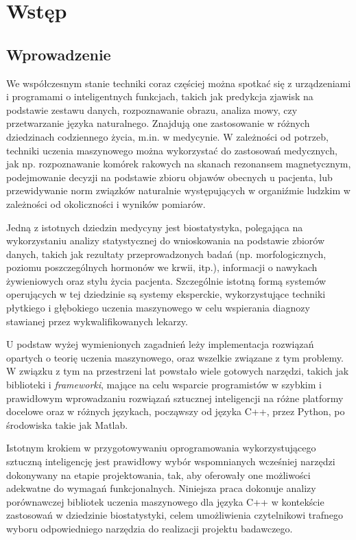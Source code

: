 \chapter{Wstęp}
\section{Wprowadzenie} %

We współczesnym stanie techniki coraz częściej można spotkać się z urządzeniami i programami o inteligentnych funkcjach, takich jak predykcja zjawisk na podstawie zestawu danych, rozpoznawanie obrazu, analiza mowy, czy przetwarzanie języka naturalnego. Znajdują one zastosowanie w różnych dziedzinach codziennego życia, m.in. w medycynie. W zależności od potrzeb, techniki uczenia maszynowego można wykorzystać do zastosowań medycznych, jak np. rozpoznawanie komórek rakowych na skanach rezonansem magnetycznym, podejmowanie decyzji na podstawie zbioru objawów obecnych u pacjenta, lub przewidywanie norm związków naturalnie występujących w organiźmie ludzkim w zależności od okoliczności i wyników pomiarów. 

Jedną z istotnych dziedzin medycyny jest biostatystyka, polegająca na wykorzystaniu analizy statystycznej do wnioskowania na podstawie zbiorów danych, takich jak rezultaty przeprowadzonych badań (np. morfologicznych, poziomu poszczególnych hormonów we krwii, itp.), informacji o nawykach żywieniowych oraz stylu życia pacjenta. Szczególnie istotną formą systemów operujących w tej dziedzinie są systemy eksperckie, wykorzystujące techniki płytkiego i głębokiego uczenia maszynowego w celu wspierania diagnozy stawianej przez wykwalifikowanych lekarzy. 

U podstaw wyżej wymienionych zagadnień leży implementacja rozwiązań opartych o teorię uczenia maszynowego, oraz wszelkie związane z tym problemy. W związku z tym na przestrzeni lat powstało wiele gotowych narzędzi, takich jak biblioteki i \textit{frameworki}, mające na celu wsparcie programistów w szybkim i prawidłowym wprowadzaniu rozwiązań sztucznej inteligencji na różne platformy docelowe oraz w różnych językach, począwszy od języka C++, przez Python, po środowiska takie jak Matlab. 

Istotnym krokiem w przygotowywaniu oprogramowania wykorzystującego sztuczną inteligencję jest prawidłowy wybór wspomnianych wcześniej narzędzi dokonywany na etapie projektowania, tak, aby oferowały one możliwości adekwatne do wymagań funkcjonalnych. Niniejsza praca dokonuje analizy porównawczej bibliotek uczenia maszynowego dla języka C++ w kontekście zastosowań w dziedzinie biostatystyki, celem umożliwienia czytelnikowi trafnego wyboru odpowiedniego narzędzia do realizacji projektu badawczego.

